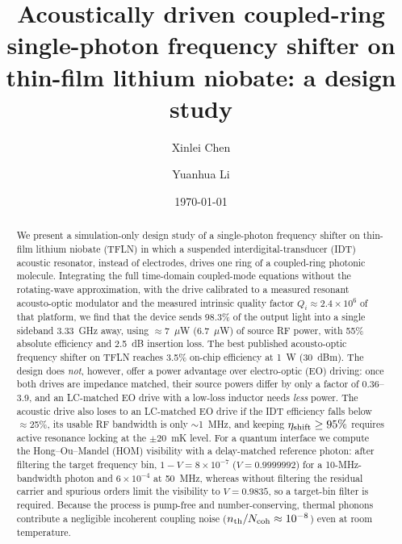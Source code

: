 \documentclass[aps,prapplied,reprint,superscriptaddress,amsmath,amssymb,floatfix]{revtex4-2}
\newcommand{\etash}{\eta_{\rm shift}}
\begin{document}
\title{Acoustically driven coupled-ring single-photon frequency shifter on thin-film lithium niobate: a design study}

\author{Xinlei Chen}
\author{Yuanhua Li}

\date{\today}

\begin{abstract}
We present a simulation-only design study of a single-photon frequency shifter on thin-film lithium niobate (TFLN) in which a suspended interdigital-transducer (IDT) acoustic resonator, instead of electrodes, drives one ring of a coupled-ring photonic molecule. Integrating the full time-domain coupled-mode equations without the rotating-wave approximation, with the drive calibrated to a measured resonant acousto-optic modulator and the measured intrinsic quality factor $Q_i\approx2.4\times10^6$ of that platform, we find that the device sends 98.3\% of the output light into a single sideband 3.33~GHz away, using $\approx$7~$\mu$W (6.7~$\mu$W) of source RF power, with 55\% absolute efficiency and 2.5~dB insertion loss. The best published acousto-optic frequency shifter on TFLN reaches 3.5\% on-chip efficiency at 1~W (30~dBm). The design does \emph{not}, however, offer a power advantage over electro-optic (EO) driving: once both drives are impedance matched, their source powers differ by only a factor of 0.36--3.9, and an LC-matched EO drive with a low-loss inductor needs \emph{less} power. The acoustic drive also loses to an LC-matched EO drive if the IDT efficiency falls below $\approx$25\%, its usable RF bandwidth is only $\sim$1~MHz, and keeping $\etash\ge95\%$ requires active resonance locking at the $\pm20$~mK level. For a quantum interface we compute the Hong--Ou--Mandel (HOM) visibility with a delay-matched reference photon: after filtering the target frequency bin, $1-V=8\times10^{-7}$ ($V=0.9999992$) for a 10-MHz-bandwidth photon and $6\times10^{-4}$ at 50~MHz, whereas without filtering the residual carrier and spurious orders limit the visibility to $V=0.9835$, so a target-bin filter is required. Because the process is pump-free and number-conserving, thermal phonons contribute a negligible incoherent coupling noise ($n_{\rm th}/N_{\rm coh}\approx10^{-8}$) even at room temperature.
\end{abstract}

\maketitle
\end{document}
